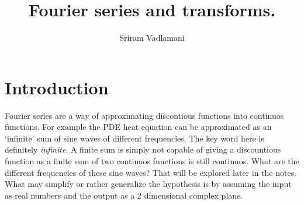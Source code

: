 \documentclass{article}
\title{Fourier series and transforms.}
\author{Sriram Vadlamani}
\begin{document}
\maketitle
\newpage
\section*{Introduction}
Fourier series are a way of approximating discontious functions into continuos functions. For example the PDE heat equation can be approximated as an `infinite' sum of sine waves of different frequencies. The key word here is definitely \textit{infinite}. A finite sum is simply not capable of giving a discountious function as a finite sum of two continuos functions is still continuos. What are the different frequencies of these sine waves? That will be explored later in the notes. What may simplify or rather generalize the hypothesis is by assuming the input as real numbers and the output as a 2 dimensional complex plane. 
\end{document}
